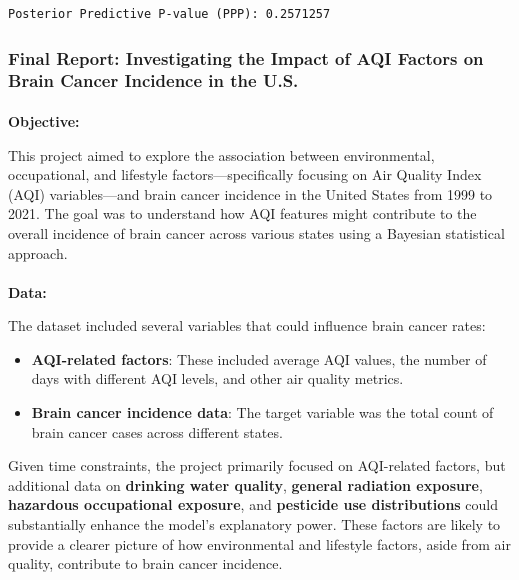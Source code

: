 \documentclass[
  12pt,
]{article}
\makeatletter
\let\oldparagraph\paragraph
\renewcommand{\paragraph}{
    \@ifstar
      \xxxParagraphStar
      \xxxParagraphNoStar
  }
\newcommand{\xxxParagraphStar}[1]{\oldparagraph*{#1}\mbox{}}
\newcommand{\xxxParagraphNoStar}[1]{\oldparagraph{#1}\mbox{}}
\makeatother
\begin{document}
\begin{verbatim}
Posterior Predictive P-value (PPP): 0.2571257 
\end{verbatim}

\subsubsection{\texorpdfstring{\textbf{Final Report: Investigating the
Impact of AQI Factors on Brain Cancer Incidence in the
U.S.}}{Final Report: Investigating the Impact of AQI Factors on Brain Cancer Incidence in the U.S.}}\label{final-report-investigating-the-impact-of-aqi-factors-on-brain-cancer-incidence-in-the-u.s.}

\paragraph{\texorpdfstring{\textbf{Objective:}}{Objective:}}\label{objective}

This project aimed to explore the association between environmental,
occupational, and lifestyle factors---specifically focusing on Air
Quality Index (AQI) variables---and brain cancer incidence in the United
States from 1999 to 2021. The goal was to understand how AQI features
might contribute to the overall incidence of brain cancer across various
states using a Bayesian statistical approach.

\paragraph{\texorpdfstring{\textbf{Data:}}{Data:}}\label{data}

The dataset included several variables that could influence brain cancer
rates:

\begin{itemize}
\item
  \textbf{AQI-related factors}: These included average AQI values, the
  number of days with different AQI levels, and other air quality
  metrics.
\item
  \textbf{Brain cancer incidence data}: The target variable was the
  total count of brain cancer cases across different states.
\end{itemize}

Given time constraints, the project primarily focused on AQI-related
factors, but additional data on \textbf{drinking water quality},
\textbf{general radiation exposure}, \textbf{hazardous occupational
exposure}, and \textbf{pesticide use distributions} could substantially
enhance the model's explanatory power. These factors are likely to
provide a clearer picture of how environmental and lifestyle factors,
aside from air quality, contribute to brain cancer incidence.
\end{document}
